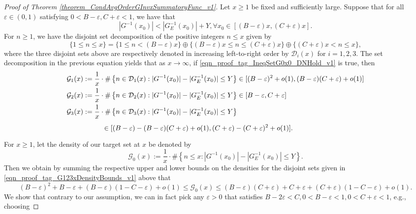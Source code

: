\documentclass[11pt,reqno,a4letter]{article}
\numberwithin{figure}{section}
\numberwithin{table}{section}
\theoremstyle{plain}
\numberwithin{theorem}{section}
\theoremstyle{definition}
\begin{document}
\begin{proof}[Proof of Theorem \ref{theorem_CondAvgOrderGInvxSummatoryFunc_v1}]
Let $x \geq 1$ be fixed and sufficiently large. 
Suppose that for all $\varepsilon \in (0, 1)$ satisfying $0 < B - \varepsilon, C+\varepsilon < 1$, we have that 
\begin{equation} 
\label{eqn_proof_tag_IneqSetG0x0_DNHold_v1} 
|G^{-1}(x_0)| < |G_E^{-1}(x_0)| + Y, \forall x_0 \in [(B-\varepsilon) x, (C+\varepsilon) x]. 
\end{equation} 
For $n \geq 1$, we have the disjoint set decomposition of the positive integers $n \leq x$ given by  
\[
\{1 \leq n \leq x\} = \{1 \leq n < (B-\varepsilon) x\} \oplus 
     \{(B-\varepsilon) x \leq n \leq (C + \varepsilon) x\} \oplus 
     \{(C+\varepsilon) x < n \leq x\}, 
\]
where the three disjoint sets above are respectively denoted in increasing 
left-to-right order by $\mathcal{D}_i(x)$ for $i = 1,2,3$. 
The set decomposition in the previous equation yields that as 
$x \rightarrow \infty$, if \eqref{eqn_proof_tag_IneqSetG0x0_DNHold_v1} is true, then 
\begin{align} 
\label{eqn_proof_tag_G123xDensityBounds_v1} 
\mathcal{G}_1(x) & := \frac{1}{x} \cdot \#\left\{n \in \mathcal{D}_1(x): |G^{-1}(x_0)| - |G_E^{-1}(x_0)| \leq Y\right\} 
     \in [(B-\varepsilon)^2 + o(1), (B-\varepsilon) (C+\varepsilon) + o(1)] \\ 
\notag 
\mathcal{G}_2(x) & := \frac{1}{x} \cdot \#\left\{n \in \mathcal{D}_2(x): |G^{-1}(x_0)| - |G_E^{-1}(x_0)| \leq Y\right\} 
     \in [B-\varepsilon, C+\varepsilon] \\ 
\notag 
\mathcal{G}_3(x) & := \frac{1}{x} \cdot \#\left\{n \in \mathcal{D}_3(x): |G^{-1}(x_0)| - |G_E^{-1}(x_0)| \leq Y\right\} \\ 
\notag 
     & \phantom{:= \frac{1}{x} \cdot \ } 
     \in [(B-\varepsilon)-(B-\varepsilon) (C+\varepsilon) + o(1), (C+\varepsilon)-(C+\varepsilon)^2 + o(1)]. 
\end{align} 
For $x \geq 1$, let the density of our target set at $x$ be denoted by 
$$\mathcal{G}_0(x) := \frac{1}{x} \cdot \#\left\{n \leq x: |G^{-1}(x_0)| - |G_E^{-1}(x_0)| \leq Y\right\}.$$ 
Then we obtain by summing the respective upper and lower bounds on the densities for the 
disjoint sets given in \eqref{eqn_proof_tag_G123xDensityBounds_v1} above that 
\[
(B-\varepsilon)^2 + B - \varepsilon + (B-\varepsilon) (1 - C - \varepsilon) + o(1) \leq \mathcal{G}_0(x) \leq 
     (B-\varepsilon) (C+\varepsilon) + C + \varepsilon + (C + \varepsilon) (1 - C - \varepsilon) + o(1). 
\]
We show that contrary to our assumption, we can in fact pick any $\varepsilon > 0$ that satisfies 
$B - 2\varepsilon < C, 0 < B - \varepsilon < 1, 0 < C + \varepsilon < 1$, e.g., choosing 

\end{proof}
\end{document}
